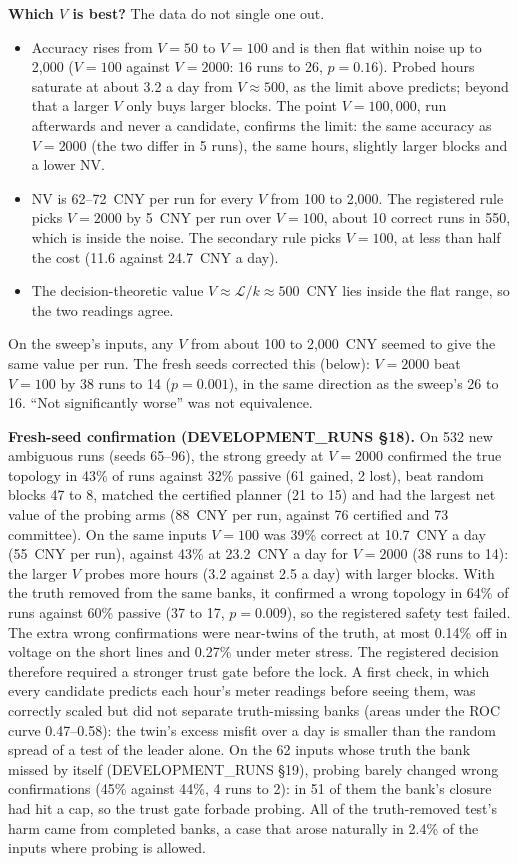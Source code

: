\documentclass[11pt]{article}
\theoremstyle{definition}
\begin{document}
{\textbf{Which $V$ is best?} The data do not single one out.
\begin{itemize}
  \item Accuracy rises from $V=50$ to $V=100$ and is then flat within noise up to 2{,}000 ($V=100$ against $V=2000$: 16 runs to 26, $p=0.16$). Probed hours saturate at about 3.2 a day from $V\approx500$, as the limit above predicts; beyond that a larger $V$ only buys larger blocks. The point $V=100{,}000$, run afterwards and never a candidate, confirms the limit: the same accuracy as $V=2000$ (the two differ in 5 runs), the same hours, slightly larger blocks and a lower $\mathrm{NV}$.
  \item $\mathrm{NV}$ is 62--72~CNY per run for every $V$ from 100 to 2{,}000. The registered rule picks $V=2000$ by 5~CNY per run over $V=100$, about 10 correct runs in 550, which is inside the noise. The secondary rule picks $V=100$, at less than half the cost (11.6 against 24.7~CNY a day).
  \item The decision-theoretic value $V\approx\mathcal L/k\approx500$~CNY lies inside the flat range, so the two readings agree.
\end{itemize}
On the sweep's inputs, any $V$ from about 100 to 2{,}000~CNY seemed to give the same value per run. The fresh seeds corrected this (below): $V=2000$ beat $V=100$ by 38 runs to 14 ($p=0.001$), in the same direction as the sweep's 26 to 16. ``Not significantly worse'' was not equivalence.

\textbf{Fresh-seed confirmation (DEVELOPMENT\_RUNS \S18).} On 532 new ambiguous runs (seeds 65--96), the strong greedy at $V=2000$ confirmed the true topology in 43\% of runs against 32\% passive (61 gained, 2 lost), beat random blocks 47 to 8, matched the certified planner (21 to 15) and had the largest net value of the probing arms (88~CNY per run, against 76 certified and 73 committee). On the same inputs $V=100$ was 39\% correct at 10.7~CNY a day (55~CNY per run), against 43\% at 23.2~CNY a day for $V=2000$ (38 runs to 14): the larger $V$ probes more hours (3.2 against 2.5 a day) with larger blocks. With the truth removed from the same banks, it confirmed a wrong topology in 64\% of runs against 60\% passive (37 to 17, $p=0.009$), so the registered safety test failed. The extra wrong confirmations were near-twins of the truth, at most 0.14\% off in voltage on the short lines and 0.27\% under meter stress. The registered decision therefore required a stronger trust gate before the lock. A first check, in which every candidate predicts each hour's meter readings before seeing them, was correctly scaled but did not separate truth-missing banks (areas under the ROC curve 0.47--0.58): the twin's excess misfit over a day is smaller than the random spread of a test of the leader alone. On the 62 inputs whose truth the bank missed by itself (DEVELOPMENT\_RUNS \S19), probing barely changed wrong confirmations (45\% against 44\%, 4 runs to 2): in 51 of them the bank's closure had hit a cap, so the trust gate forbade probing. All of the truth-removed test's harm came from completed banks, a case that arose naturally in 2.4\% of the inputs where probing is allowed.

}
\end{document}
